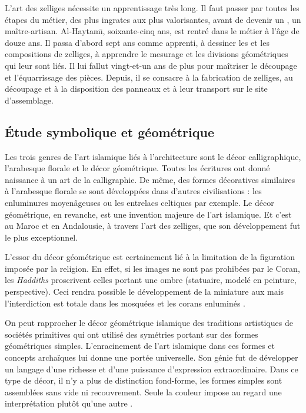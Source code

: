 L'art des zelliges nécessite un apprentissage très long. Il faut 
passer par toutes les étapes du métier, des plus ingrates aux plus 
valorisantes, avant de devenir un \maallem, un maître-artisan. 
Al-Haytam\={\i}, soixante-cinq ans, est rentré dans le métier à l'âge 
de douze ans. Il passa d'abord sept ans comme apprenti, à dessiner 
les \furma et les compositions de zelliges, à apprendre 
le mesurage et les divisions géométriques qui leur sont liés. Il 
lui fallut vingt-et-un ans de plus pour maîtriser le découpage et 
l'équarrissage des pièces. Depuis, il se consacre à la fabrication 
de zelliges, au découpage et à la disposition des panneaux et à leur 
transport sur le site d'assemblage.

\subsection{Étude symbolique et géométrique}
Les trois genres de l'art islamique liés à l'architecture sont le 
décor calligraphique, l'arabesque florale et le décor géométrique. 
Toutes les écritures ont donné naissance à un art de la calligraphie. 
De même, des formes décoratives similaires à l'arabesque florale se 
sont développées dans d'autres civilisations : les enluminures 
moyenâgeuses ou les entrelacs celtiques par exemple. Le décor 
géométrique, en revanche, est une invention majeure de l'art 
islamique. Et c'est au Maroc et en Andalousie, à travers l'art des 
zelliges, que son développement fut le plus exceptionnel.

L'essor du décor géométrique est certainement lié à la limitation 
de la figuration imposée par la religion. En effet, si les images 
ne sont pas prohibées par le Coran, les \emph{Haddiths} 
proscrivent celles portant une ombre (statuaire, modelé en peinture, 
perspective). Ceci rendra possible le développement de la miniature 
aux  mais l'interdiction est totale dans 
les mosquées et les corans enluminés \autocite{Castera_1996}.

On peut rapprocher le décor géométrique islamique des traditions 
artistiques de sociétés primitives qui ont utilisé des symétries 
portant sur des formes géométriques simples. L'enracinement de l'art 
islamique dans ces formes et concepts archaïques lui donne une portée 
universelle. Son génie fut de développer un langage d'une richesse et 
d'une puissance d'expression extraordinaire. Dans ce type de décor, 
il n'y a plus de distinction fond-forme, les formes simples sont 
assemblées sans vide ni recouvrement. Seule la couleur impose au 
regard une interprétation plutôt qu'une autre \autocite{Castera_1996}.

